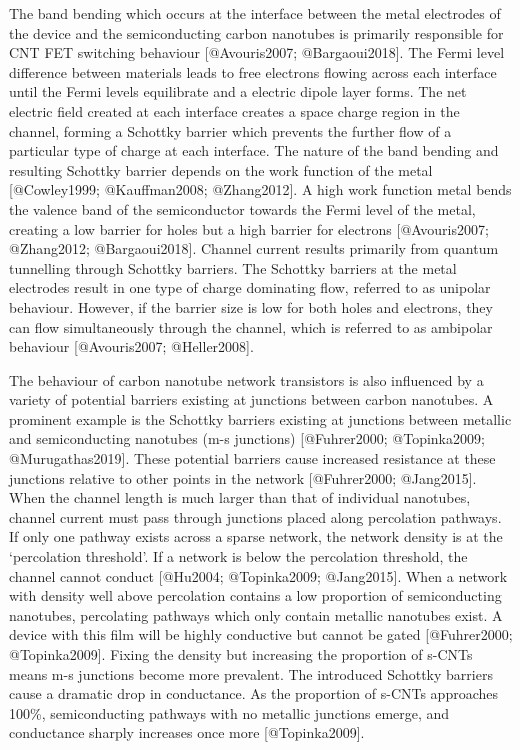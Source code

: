 \documentclass[
  letterpaper,
  DIV=11,
  numbers=noendperiod]{scrartcl}
\begin{document}
The band bending which occurs at the interface between the metal
electrodes of the device and the semiconducting carbon nanotubes is
primarily responsible for CNT FET switching behaviour {[}@Avouris2007;
@Bargaoui2018{]}. The Fermi level difference between materials leads to
free electrons flowing across each interface until the Fermi levels
equilibrate and a electric dipole layer forms. The net electric field
created at each interface creates a space charge region in the channel,
forming a Schottky barrier which prevents the further flow of a
particular type of charge at each interface. The nature of the band
bending and resulting Schottky barrier depends on the work function of
the metal {[}@Cowley1999; @Kauffman2008; @Zhang2012{]}. A high work
function metal bends the valence band of the semiconductor towards the
Fermi level of the metal, creating a low barrier for holes but a high
barrier for electrons {[}@Avouris2007; @Zhang2012; @Bargaoui2018{]}.
Channel current results primarily from quantum tunnelling through
Schottky barriers. The Schottky barriers at the metal electrodes result
in one type of charge dominating flow, referred to as unipolar
behaviour. However, if the barrier size is low for both holes and
electrons, they can flow simultaneously through the channel, which is
referred to as ambipolar behaviour {[}@Avouris2007; @Heller2008{]}.

The behaviour of carbon nanotube network transistors is also influenced
by a variety of potential barriers existing at junctions between carbon
nanotubes. A prominent example is the Schottky barriers existing at
junctions between metallic and semiconducting nanotubes (m-s junctions)
{[}@Fuhrer2000; @Topinka2009; @Murugathas2019{]}. These potential
barriers cause increased resistance at these junctions relative to other
points in the network {[}@Fuhrer2000; @Jang2015{]}. When the channel
length is much larger than that of individual nanotubes, channel current
must pass through junctions placed along percolation pathways. If only
one pathway exists across a sparse network, the network density is at
the `percolation threshold'. If a network is below the percolation
threshold, the channel cannot conduct {[}@Hu2004; @Topinka2009;
@Jang2015{]}. When a network with density well above percolation
contains a low proportion of semiconducting nanotubes, percolating
pathways which only contain metallic nanotubes exist. A device with this
film will be highly conductive but cannot be gated {[}@Fuhrer2000;
@Topinka2009{]}. Fixing the density but increasing the proportion of
s-CNTs means m-s junctions become more prevalent. The introduced
Schottky barriers cause a dramatic drop in conductance. As the
proportion of s-CNTs approaches 100\%, semiconducting pathways with no
metallic junctions emerge, and conductance sharply increases once more
{[}@Topinka2009{]}.
\end{document}

